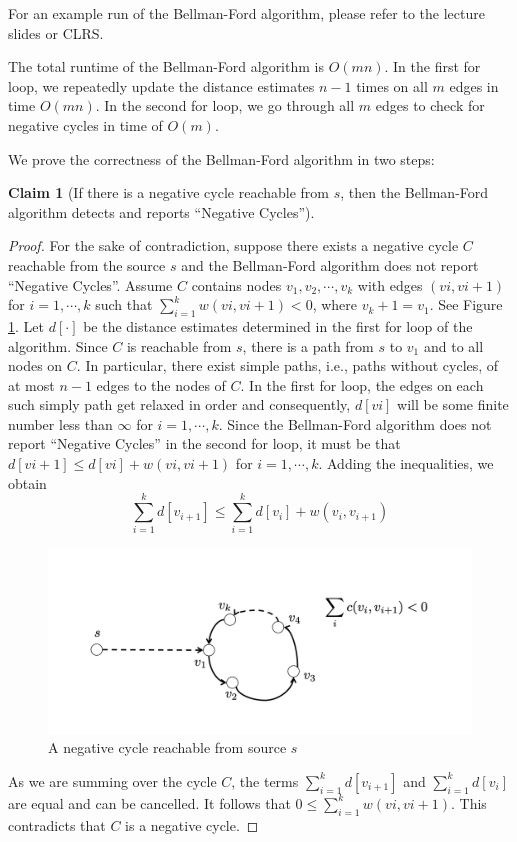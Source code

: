 \documentclass [12pt]{article}
\theoremstyle{definition}
\newtheorem{claim}{Claim}
\begin{document}
For an example run of the Bellman-Ford algorithm, please refer to the lecture slides or CLRS.

The total runtime of the Bellman-Ford algorithm is $O(mn)$. In the first for loop, we repeatedly update the distance estimates $n - 1$ times on all $m$ edges in time $O(mn)$. In the second for loop, we go through all $m$ edges to check for negative cycles in time of $O(m)$. 

We prove the correctness of the Bellman-Ford algorithm in two steps:

\begin{claim}[If there is a negative cycle reachable from $s$, then the Bellman-Ford algorithm detects and reports ``Negative Cycles'']
\begin{proof}

For the sake of contradiction, suppose there exists a negative cycle $C$ reachable from the source $s$ and the Bellman-Ford algorithm does not report ``Negative Cycles''. Assume $C$ contains nodes $v_1, v_2, \cdots , v_k$ with edges $(vi , vi+1)$ for $i = 1, \cdots , k$ such that $\sum^{k}_{i=1} w(vi , vi+1) < 0$, where $v_k+1 = v_1$. See Figure \ref{fig:cycle}. Let $d[\cdot]$ be the distance estimates determined in the first for loop of the algorithm. Since $C$ is reachable from $s$, there is a path from $s$ to $v_1$ and to all nodes on $C$. In particular, there exist simple paths, i.e., paths without cycles, of at most $n - 1$ edges to the nodes of $C$. In the first for loop, the edges on each such simply path get relaxed in order and consequently, $d[vi ]$ will be some finite number less than $\infty$ for $i = 1, \cdots , k$. Since the Bellman-Ford algorithm does not report ``Negative Cycles'' in the second for loop, it must be that $d[vi+1] \leq d[vi ] + w(vi , vi+1)$ for $i = 1, \cdots , k$. Adding the inequalities, we obtain
$$
\sum_{i=1}^k d[v_{i+1}] \leq \sum_{i=1}^k d[v_i] + w(v_i, v_{i+1})
$$


\begin{figure}
\centering
\includegraphics[scale=0.5]{Cycle.png}
\caption{A negative cycle reachable from source $s$}
\label{fig:cycle}
\end{figure}
 
As we are summing over the cycle $C$, the terms $\sum_{i=1}^k d[v_{i+1}]$ and $\sum_{i=1}^k d[v_i ]$ are equal and can be cancelled. It follows that $0 \leq \sum_{i=1}^k w(vi , vi+1)$. This contradicts that $C$ is a negative cycle.

\end{proof}
\end{claim}
\end{document}
